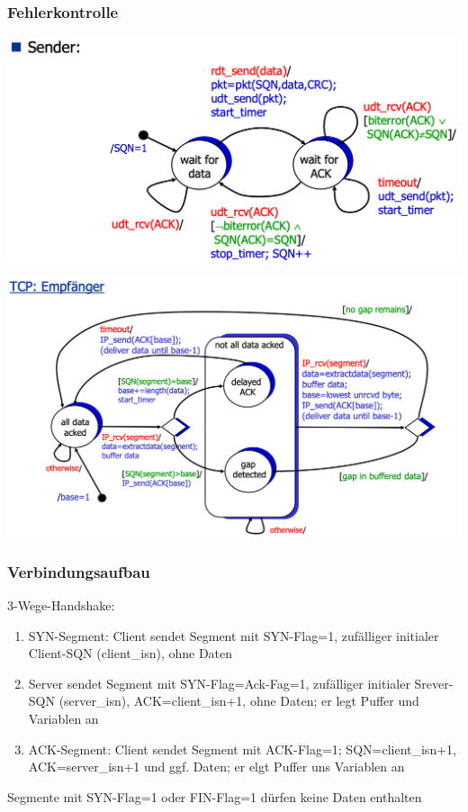 \subsubsection{Fehlerkontrolle}
\begin{multicols}{2}
\begin{center}
	\includegraphics[scale=0.15]{images/Stop_and_Wait_Sender.png}
\end{center}
\begin{center}
	\includegraphics[scale=0.15]{images/TCP_Fehlerkontrolle_Empfaenger.png}	
\end{center}
\end{multicols}
\subsubsection{Verbindungsaufbau}
3-Wege-Handshake:
\begin{enumerate}
	\item SYN-Segment: Client sendet Segment mit SYN-Flag=1, zufälliger initialer Client-SQN (client\_isn), ohne Daten
	\item Server sendet Segment mit SYN-Flag=Ack-Fag=1, zufälliger initialer Srever-SQN (server\_isn), ACK=client\_isn+1, ohne Daten; er legt Puffer und Variablen an
	\item ACK-Segment: Client sendet Segment mit ACK-Flag=1; SQN=client\_isn+1, ACK=server\_isn+1 und ggf. Daten; er elgt Puffer uns Variablen an 
\end{enumerate}
Segmente mit SYN-Flag=1 oder FIN-Flag=1 dürfen keine Daten enthalten

